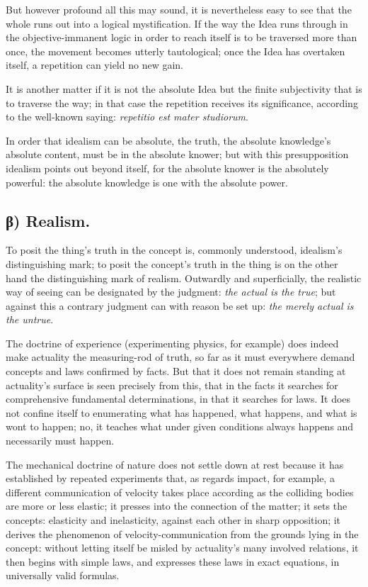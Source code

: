\documentclass[12pt]{book}
\begin{document}
But however profound all this may sound, it is nevertheless easy to
see that the whole runs out into a logical mystification. If the way
the Idea runs through in the objective-immanent logic in order to
reach itself is to be traversed more than once, the movement becomes
utterly tautological; once the Idea has overtaken itself, a
repetition can yield no new gain.

It is another matter if it is not the absolute Idea but the finite
subjectivity that is to traverse the way; in that case the
repetition receives its significance, according to the well-known
saying: \textit{repetitio est mater studiorum}.

In order that idealism can be absolute, the truth, the absolute
knowledge's absolute content, must be in the absolute knower; but
with this presupposition idealism points out beyond itself, for the
absolute knower is the absolutely powerful: the absolute knowledge
is one with the absolute power.

\subsection*{β) Realism.}

To posit the thing's truth in the concept is, commonly understood,
idealism's distinguishing mark; to posit the concept's truth in the
thing is on the other hand the distinguishing mark of realism.
Outwardly and superficially, the realistic way of seeing can be
designated by the judgment: \emph{the actual is the
true}; but against this a contrary judgment can with reason be set
up: \emph{the merely actual is the untrue}.

The doctrine of experience (experimenting physics, for example) does
indeed make actuality the measuring-rod of truth, so far as it must
everywhere demand concepts and laws confirmed by facts. But that it
does not remain standing at actuality's surface is seen precisely
from this, that in the facts it searches for comprehensive
fundamental determinations, in that it searches for laws. It does
not confine itself to enumerating what has happened, what happens,
and what is wont to happen; no, it teaches what under given
conditions always happens and necessarily must happen.

The mechanical doctrine of nature does not settle down at rest
because it has established by repeated experiments that, as regards
impact, for example, a different communication of velocity takes
place according as the colliding bodies are more or less elastic; it
presses into the connection of the matter; it sets the concepts:
elasticity and inelasticity, against each other in sharp opposition;
it derives the phenomenon of velocity-communication from the grounds
lying in the concept: without letting itself be misled by
actuality's many involved relations, it then begins with simple
laws, and expresses these laws in exact equations, in universally
valid formulas.
\end{document}
